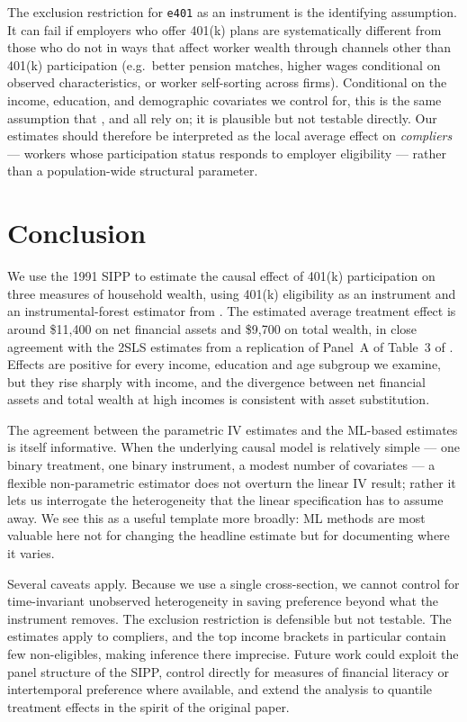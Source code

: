 \documentclass[11pt]{article}
\begin{document}
The exclusion restriction for \texttt{e401} as an instrument is the
identifying assumption.  It can fail if employers who offer 401(k) plans
are systematically different from those who do not in ways that affect
worker wealth through channels other than 401(k) participation (e.g.\
better pension matches, higher wages conditional on observed
characteristics, or worker self-sorting across firms).  Conditional on the
income, education, and demographic covariates we control for, this is the
same assumption that \cite{ch2004}, \citet{poterba1995etal} and
\cite{abadie2003} all rely on; it is plausible but not testable directly.
Our estimates should therefore be interpreted as the local average effect
on \emph{compliers} --- workers whose participation status responds to
employer eligibility --- rather than a population-wide structural
parameter.

\section{Conclusion}\label{sec:conclusion}

We use the 1991 SIPP to estimate the causal effect of 401(k) participation
on three measures of household wealth, using 401(k) eligibility as an
instrument and an instrumental-forest estimator from \cite{athey2019grf}.
The estimated average treatment effect is around \$11{,}400 on net
financial assets and \$9{,}700 on total wealth, in close agreement with the
2SLS estimates from a replication of Panel~A of Table~3 of \cite{ch2004}.
Effects are positive for every income, education and age subgroup we
examine, but they rise sharply with income, and the divergence between net
financial assets and total wealth at high incomes is consistent with
asset substitution.

The agreement between the parametric IV estimates and the ML-based
estimates is itself informative.  When the underlying causal model is
relatively simple --- one binary treatment, one binary instrument, a modest
number of covariates --- a flexible non-parametric estimator does not
overturn the linear IV result; rather it lets us interrogate the
heterogeneity that the linear specification has to assume away.  We see
this as a useful template more broadly: ML methods are most valuable here
not for changing the headline estimate but for documenting where it varies.

Several caveats apply.  Because we use a single cross-section, we cannot
control for time-invariant unobserved heterogeneity in saving preference
beyond what the instrument removes.  The exclusion restriction is
defensible but not testable.  The estimates apply to compliers, and the
top income brackets in particular contain few non-eligibles, making
inference there imprecise.  Future work could exploit the panel structure
of the SIPP, control directly for measures of financial literacy or
intertemporal preference where available, and extend the analysis to
quantile treatment effects in the spirit of the original
\cite{ch2004} paper.
\end{document}

